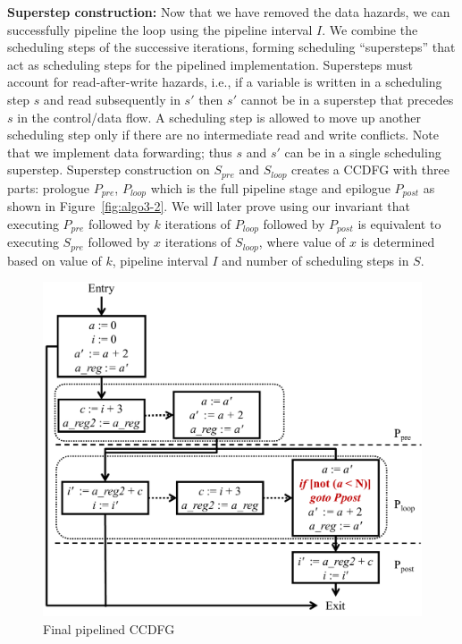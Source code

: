 {\bf Superstep construction:} Now that we have removed the data hazards, we can successfully pipeline the loop using  the pipeline interval $I$. We combine the scheduling steps of the successive iterations, forming scheduling ``supersteps'' that act as scheduling steps for the pipelined
implementation. Supersteps must account for read-after-write hazards, i.e., if a variable is written in a scheduling step $s$ and read subsequently in $s'$ then $s'$ cannot be in a superstep that precedes $s$ in the control/data flow. A scheduling step is allowed to move up another scheduling step only if there are no intermediate read and write conflicts. Note that we implement data forwarding; thus $s$ and $s'$ can be in a single scheduling superstep.
Superstep construction on $S_{pre}$ and $S_{loop}$ creates a CCDFG with three parts: prologue $P_{pre}$, $P_{loop}$ which is the full pipeline stage and epilogue $P_{post}$ as shown in Figure~\ref{fig:algo3-2}. We will later prove using our invariant that executing $P_{pre}$ followed by $k$ iterations of $P_{loop}$ followed by $P_{post}$ is equivalent to executing $S_{pre}$ followed by $x$ iterations of $S_{loop}$, where value of $x$ is determined based on value of $k$, pipeline interval $I$ and number of scheduling steps in $S$.

\begin{figure}[t!]
\begin{center}
\includegraphics[width=5.5in]{fig-proposal/algorithm-after-adding-branches}
\end{center}
\caption{Final pipelined CCDFG}
\label{fig:algo4}
\end{figure}

